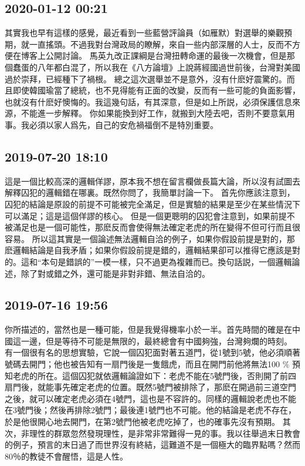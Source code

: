 \documentclass[twocolumn]{ctexart}
\begin{document}
\subsection*{2020-01-12 00:21}

其實我也早有這樣的感覺，最近看到一些藍營評論員（如雁默）對選舉的樂觀預期，就一直搖頭。不過我對台灣政局的瞭解，來自一些内部深層的人士，反而不方便在博客上公開討論。 
馬英九改正課綱是台灣扭轉命運的最後一次機會，但是那個蠢蛋的八年都白混了，所以我在《八方論壇》上說蔣經國過世前後，台灣對美國過於崇拜，已經種下了禍根。 
總之這次選舉並不是意外，沒有什麽好震驚的。而且即使韓國瑜當了總統，也不見得能有正面的改變，反而有一些可能的負面影響，也就沒有什麽好懊悔的。我這幾句話，有其深意，但是如上所説，必須保護信息來源，不能進一步解釋。 
你如果能換到好工作，就搬到大陸去吧，否則不要意氣用事。我必須以家人爲先，自己的安危禍福倒不是特別重要。
\subsection*{2019-07-20 18:10}

這是一個比較高深的邏輯佯謬，原本我不想在留言欄做長篇大論，所以沒有試圖去解釋囚犯的邏輯錯在哪裏。既然你問了，我簡單討論一下。 
首先你應該注意到，囚犯的結論是原設的前提不可能被完全滿足，但是實驗的結果是至少在某些情況下可以滿足；這是這個佯謬的核心。 
但是一個更聰明的囚犯會注意到，如果前提不被滿足也是一個可能性，那麽反而會使得無法確定老虎的所在變得不但可行而且很容易。 
所以這其實是一個論述無法邏輯自洽的例子，如果你假設前提是對的，那麽邏輯結論是自我矛盾；如果你假設前提是錯的，邏輯結果卻可以推得它應該是對的。這和“本句是錯誤的”一模一樣，只不過更為複雜而已。換句話説，一個邏輯論述，除了對或錯之外，還可能是非對非錯、無法自洽的。
\subsection*{2019-07-16 19:56}

你所描述的，當然也是一種可能，但是我覺得機率小於一半。首先時間的確是在中國這一邊，但是等待不可能是無限的，最終總會有中國夠強，台灣夠爛的時刻。 
有一個很有名的思想實驗，它說一個囚犯面對著五道門，從1號到5號，他必須順著號碼去開門；他也被告知有一扇門後是一隻餓虎，而且在開門前他將無法100 \% 預知老虎的所在。這個囚犯就依邏輯論證如下：老虎不能在5號門後，否則開了前四扇門後，就能事先確定老虎的位置。既然5號門被排除了，那麽在開過前三道空門之後，就可以確定老虎必須在4號門，這也是不容許的。同樣的邏輯說老虎也不能在3號門後；然後再排除2號門；最後連1號門也不可能。他的結論是老虎不存在，於是他很開心地去開門，在第2號門他被老虎吃掉了，也的確事先沒有預期。 
其次，非理性的群眾忽然發現理性，是非常非常難得一見的事。我以往舉過末日教會的例子，預言的末日過了而世界沒有終結，這難道不是一個極大的臨界點嗎？然而80％的教徒不會醒悟，這是人性。
\end{document}

